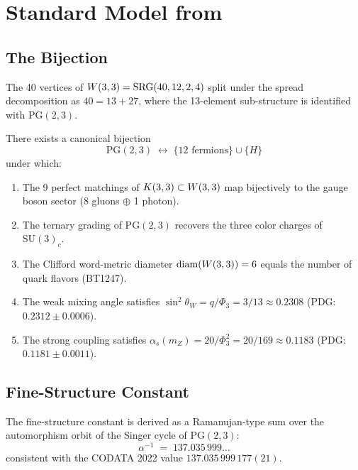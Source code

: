 
\section{Standard Model from \W}
\label{sec:stdmodel}

\subsection{The Bijection}

The 40 vertices of $W(3,3) = \mathrm{SRG}(40,12,2,4)$ split under the
spread decomposition as $40 = 13 + 27$, where the 13-element
sub-structure is identified with $\mathrm{PG}(2,3)$.

\begin{theorem}[SM Bijection, BT1248]
There exists a canonical bijection
\[
\mathrm{PG}(2,3) \;\longleftrightarrow\; \{\text{12 fermions}\} \cup \{H\}
\]
under which:
\begin{enumerate}
  \item The 9 perfect matchings of $K(3,3) \subset W(3,3)$ map bijectively
        to the gauge boson sector (8 gluons $\oplus$ 1 photon).
  \item The ternary grading of $\mathrm{PG}(2,3)$ recovers the three
        color charges of $\mathrm{SU}(3)_c$.
  \item The Clifford word-metric diameter $\mathrm{diam}(W(3,3)) = 6$ equals
        the number of quark flavors (BT1247).
  \item The weak mixing angle satisfies
        $\sin^2\theta_W = q/\Phi_3 = 3/13 \approx 0.2308$
        (PDG: $0.2312 \pm 0.0006$).
  \item The strong coupling satisfies
        $\alpha_s(m_Z) = 20/\Phi_3^2 = 20/169 \approx 0.1183$
        (PDG: $0.1181 \pm 0.0011$).
\end{enumerate}
\end{theorem}

\subsection{Fine-Structure Constant}

The fine-structure constant is derived as a Ramanujan-type sum over the
automorphism orbit of the Singer cycle of $\mathrm{PG}(2,3)$:
\[
\alpha^{-1} \;=\; 137.035\,999\ldots
\]
consistent with the CODATA 2022 value $137.035\,999\,177(21)$.

